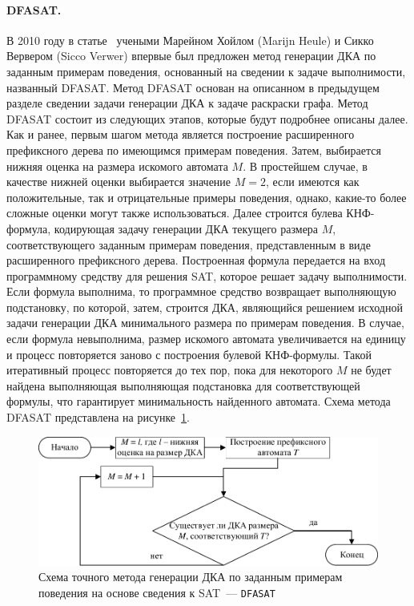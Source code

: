 \paragraph*{DFASAT.}
В 2010 году в статье~\cite{heule-icgi10} учеными Марейном Хойлом (Marijn Heule) и Сикко Вервером (Sicco Verwer) впервые был предложен метод генерации ДКА по заданным примерам поведения, основанный на сведении к задаче выполнимости, названный DFASAT.
Метод DFASAT основан на описанном в предыдущем разделе сведении задачи генерации ДКА к задаче раскраски графа.
Метод DFASAT состоит из следующих этапов, которые будут подробнее описаны далее.
Как и ранее, первым шагом метода является построение расширенного префиксного дерева по имеющимся примерам поведения.
Затем, выбирается нижняя оценка на размера искомого автомата $M$. 
В простейшем случае, в качестве нижней оценки выбирается значение $M = 2$, если имеются как положительные, так и отрицательные примеры поведения, однако, какие-то более сложные оценки могут также использоваться.
Далее строится булева КНФ-формула, кодирующая задачу генерации ДКА текущего размера $M$, соответствующего заданным примерам поведения, представленным в виде расширенного префиксного дерева.
Построенная формула передается на вход программному средству для решения SAT, которое решает задачу выполнимости.
Если формула выполнима, то программное средство возвращает выполняющую подстановку, по которой, затем, строится ДКА, являющийся решением исходной задачи генерации ДКА минимального размера по примерам поведения.
В случае, если формула невыполнима, размер искомого автомата увеличивается на единицу и процесс повторяется заново с построения булевой КНФ-формулы.
Такой итеративный процесс повторяется до тех пор, пока для некоторого $M$ не будет найдена выполняющая выполняющая подстановка для соответствующей формулы, что гарантирует минимальность найденного автомата.
Схема метода DFASAT представлена на рисунке~\ref{img:dfasat-algo}.
%
\begin{figure}[ht]
  \centering
  \includegraphics[scale=0.9]{img/ntv/basic.pdf}
  \caption{Схема точного метода генерации ДКА по заданным примерам поведения на основе сведения к SAT~--- \texttt{DFASAT}}
  \label{img:dfasat-algo}
\end{figure}

